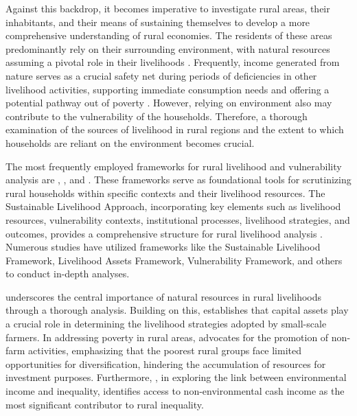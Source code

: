 Against this backdrop, it becomes imperative to investigate rural areas, their inhabitants, and their means of sustaining themselves to develop a more comprehensive understanding of rural economies. The residents of these areas predominantly rely on their surrounding environment, with natural resources assuming a pivotal role in their livelihoods \citep{nawrotzki2012natural}. Frequently, income generated from nature serves as a crucial safety net during periods of deficiencies in other livelihood activities, supporting immediate consumption needs and offering a potential pathway out of poverty \citep{angelsen2003exploring}. However, relying on environment also may contribute to the vulnerability of the households. Therefore, a thorough examination of the sources of livelihood in rural regions and the extent to which households are reliant on the environment becomes crucial.\par

The most frequently employed frameworks for rural livelihood and vulnerability analysis are \cite{anani1999sustainable}, \cite{dfid1999sustainable}, and \cite{ellis1999rural}. These frameworks serve as foundational tools for scrutinizing rural households within specific contexts and their livelihood resources. The Sustainable Livelihood Approach, incorporating key elements such as livelihood resources, vulnerability contexts, institutional processes, livelihood strategies, and outcomes, provides a comprehensive structure for rural livelihood analysis \citep{walelign2017dynamics}. Numerous studies have utilized frameworks like the Sustainable Livelihood Framework, Livelihood Assets Framework, Vulnerability Framework, and others to conduct in-depth analyses.\par

\cite{nawrotzki2012natural} underscores the central importance of natural resources in rural livelihoods through a thorough analysis. Building on this, \cite{diaz2019livelihood} establishes that capital assets play a crucial role in determining the livelihood strategies adopted by small-scale farmers. In addressing poverty in rural areas, \cite{mukotami2014rural} advocates for the promotion of non-farm activities, emphasizing that the poorest rural groups face limited opportunities for diversification, hindering the accumulation of resources for investment purposes. Furthermore, \cite{cavendish2008poverty}, in exploring the link between environmental income and inequality, identifies access to non-environmental cash income as the most significant contributor to rural inequality.\par

